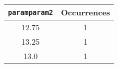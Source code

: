\begin{longtable}{|c|c|}
\hline
\textbf{\texttt{paramparam2}} & \textbf{Occurrences} \\
\hline
12.75 & 1 \\
\hline
13.25 & 1 \\
\hline
13.0 & 1 \\
\hline
\end{longtable}